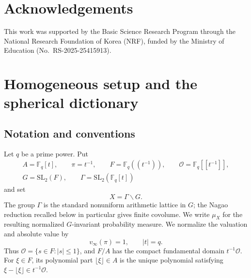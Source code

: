 \documentclass[11pt]{amsart}
\theoremstyle{definition}
\theoremstyle{plain}
\newcommand{\Fq}{\mathbb F_q}
\newcommand{\Floc}{\mathbb F_q(\!(t^{-1})\!)}
\newcommand{\cO}{\mathcal O}
\begin{document}
\section*{Acknowledgements}
This work was supported by the Basic Science Research Program through the
National Research Foundation of Korea (NRF), funded by the Ministry of
Education (No.~RS-2025-25415913).

\section{Homogeneous setup and the spherical dictionary}\label{sec:spherical-dictionary}

\subsection{Notation and conventions}
Let \(q\) be a prime power.  Put
\[
\begin{gathered}
A=\Fq[t],\qquad \pi=t^{-1},\qquad
F=\Floc,\qquad \cO=\Fq[\![t^{-1}]\!],\\
G=\mathrm{SL}_2(F),\qquad
\Gamma=\mathrm{SL}_2(\Fq[t])
\end{gathered}
\]
and set
\[
X=\Gamma\backslash G.
\]
The group \(\Gamma\) is the standard nonuniform arithmetic lattice in \(G\);
the Nagao reduction recalled below in particular gives finite covolume.  We
write \(\mu_X\) for the resulting normalized \(G\)-invariant probability
measure.
We normalize the valuation and absolute value by
\[
v_\infty(\pi)=1,\qquad |t|=q.
\]
Thus \(\cO=\{s\in F:|s|\le1\}\), and \(F/A\) has the compact fundamental
domain \(t^{-1}\cO\).  For \(\xi\in F\), its polynomial part
\(\lfloor\xi\rfloor\in A\) is the unique polynomial satisfying
\(\xi-\lfloor\xi\rfloor\in t^{-1}\cO\).
\end{document}
